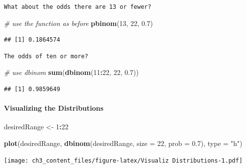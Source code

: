 \documentclass[]{article}
\newenvironment{Shaded}{\begin{snugshade}}{\end{snugshade}}
\newcommand{\KeywordTok}[1]{\textcolor[rgb]{0.13,0.29,0.53}{\textbf{#1}}}
\newcommand{\DataTypeTok}[1]{\textcolor[rgb]{0.13,0.29,0.53}{#1}}
\newcommand{\DecValTok}[1]{\textcolor[rgb]{0.00,0.00,0.81}{#1}}
\newcommand{\FloatTok}[1]{\textcolor[rgb]{0.00,0.00,0.81}{#1}}
\newcommand{\StringTok}[1]{\textcolor[rgb]{0.31,0.60,0.02}{#1}}
\newcommand{\CommentTok}[1]{\textcolor[rgb]{0.56,0.35,0.01}{\textit{#1}}}
\newcommand{\OperatorTok}[1]{\textcolor[rgb]{0.81,0.36,0.00}{\textbf{#1}}}
\newcommand{\NormalTok}[1]{#1}
\let\oldparagraph\paragraph
\renewcommand{\paragraph}[1]{\oldparagraph{#1}\mbox{}}
\begin{document}
\begin{verbatim}
What about the odds there are 13 or fewer?
\end{verbatim}

\begin{Shaded}
\begin{Highlighting}[]
\CommentTok{# use the function as before}
\KeywordTok{pbinom}\NormalTok{(}\DecValTok{13}\NormalTok{, }\DecValTok{22}\NormalTok{, }\FloatTok{0.7}\NormalTok{)}
\end{Highlighting}
\end{Shaded}

\begin{verbatim}
## [1] 0.1864574
\end{verbatim}

\begin{verbatim}
The odds of ten or more?
\end{verbatim}

\begin{Shaded}
\begin{Highlighting}[]
\CommentTok{# use dbinom}
\KeywordTok{sum}\NormalTok{(}\KeywordTok{dbinom}\NormalTok{(}\DecValTok{11}\OperatorTok{:}\DecValTok{22}\NormalTok{, }\DecValTok{22}\NormalTok{, }\FloatTok{0.7}\NormalTok{))}
\end{Highlighting}
\end{Shaded}

\begin{verbatim}
## [1] 0.9859649
\end{verbatim}

\paragraph{Visualizing the
Distributions}\label{visualizing-the-distributions}

\begin{Shaded}
\begin{Highlighting}[]
\NormalTok{desiredRange <-}\StringTok{ }\DecValTok{1}\OperatorTok{:}\DecValTok{22}

\KeywordTok{plot}\NormalTok{(desiredRange, }\KeywordTok{dbinom}\NormalTok{(desiredRange, }\DataTypeTok{size =} \DecValTok{22}\NormalTok{, }\DataTypeTok{prob =} \FloatTok{0.7}\NormalTok{), }\DataTypeTok{type =} \StringTok{"h"}\NormalTok{)}
\end{Highlighting}
\end{Shaded}

\texttt{[image: ch3\_content\_files/figure-latex/Visualiz Distributions-1.pdf]}
\end{document}
